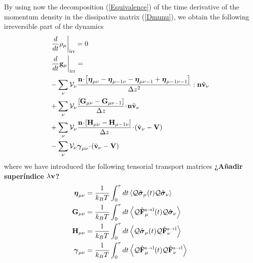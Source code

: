 \documentclass[b5paper,openright,11pt]{book}
\newcommand{\esc}{\!\cdot\!}
\newcommand{\Note}[1]{{\bf \color{red}#1}}    %
\begin{document}
By  using  now  the  decomposition  (\ref{Equivalence})  of  the  time
derivative  of   the  momentum  density  in   the  dissipative  matrix
(\ref{Dmunu}),  we  obtain  the  following irreversible  part  of  the
dynamics
\begin{align}
&\left.\frac{d}{dt}\rho_\mu\right|_{\rm irr}= 0
\nonumber\\
&\left.\frac{d}{dt}{\bf g}_\mu\right|_{\rm irr}=
\nonumber\\
&-\sum_{\nu}{\cal V}_\nu \frac{{\bf n}\esc\left[\boldsymbol{\eta}_{\mu\nu}-\boldsymbol{\eta}_{\mu-1\nu}-\boldsymbol{\eta}_{\mu\nu-1}+\boldsymbol{\eta}_{\mu-1\nu-1}\right]}{\Delta z^2}:{\bf n}\tilde{\bf v}_\nu
\nonumber\\
&+\sum_{\nu}{\cal V}_\nu\frac{\left[{\bf G}_{\mu\nu}-{\bf G}_{\mu\nu-1}\right]}{\Delta z}\esc{\bf n}\tilde{\bf v}_\nu
\nonumber\\
&+\sum_{\nu}{\cal V}_\nu\frac{{\bf n}\esc\left[{\bf H}_{\mu\nu}-{\bf H}_{\mu-1\nu}\right]}{\Delta z}\esc(\tilde{\bf v}_\nu-{\bf V})
\nonumber\\
&-\sum_{\nu}{\cal V}_\nu\boldsymbol{\gamma}_{\mu\nu}\esc(\tilde{\bf v}_\nu-{\bf V})
\label{Irr-Fin}
\end{align}
where we have introduced the following tensorial transport matrices \Note{¿Añadir superíndice $\lambda {\bf v}$?}
\begin{align}
\boldsymbol{\eta}_{\mu\nu}
&=\frac{1}{k_BT}\int_0^{\tau} dt
\left\langle {\cal Q}\hat{\boldsymbol{\sigma}}_{\mu}(t){\cal Q}\hat{\boldsymbol{\sigma}}_{\nu}
\right\rangle
\nonumber\\
{\bf G}_{\mu\nu}&=\frac{1}{k_BT}\int_0^{\tau} dt
\left\langle{\cal Q}\hat{\bf F}^{\rm s\to l}_\mu(t)
{\cal Q}\hat{\boldsymbol{\sigma}}_\nu
\right\rangle
\nonumber\\
{\bf H}_{\mu\nu}&=
\frac{1}{k_BT}\int_0^{\tau} dt
\left\langle{\cal Q}\hat{\boldsymbol{\sigma}}_\mu(t){\cal Q}\hat{\bf F}^{\rm s\to l}_\nu\right\rangle
\nonumber\\
\boldsymbol{\gamma}_{\mu\nu}
&=\frac{1}{k_BT}\int_0^{\tau} dt
\left\langle 
{\cal Q}\hat{\bf F}^{\rm s\to l}_\mu(t)
{\cal Q}\hat{\bf F}^{\rm s\to l}_\nu\right\rangle
\label{MolTransportCoeff}
\end{align}
\end{document}
